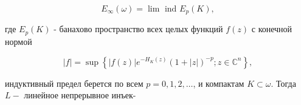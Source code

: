 \documentclass[10pt]{article}
\begin{document}
\[

E_{\infty}(\omega)=\lim \text { ind } E_{p}(K),

\]



где $E_{p}(K)$ - банахово пространство всех целых функций $f(z)$ с конечной нормой



\[

|f|=\sup \left\{|f(z)| e^{-H_{K}(z)}(1+|z|)^{-p} ; z \in \mathbb{C}^{n}\right\},

\]



индуктивный предел берется по всем $p=0,1,2, \ldots$, и компактам $K \subset \omega$. Тогда $L-$ линейное непрерывное инъек-
\end{document}
